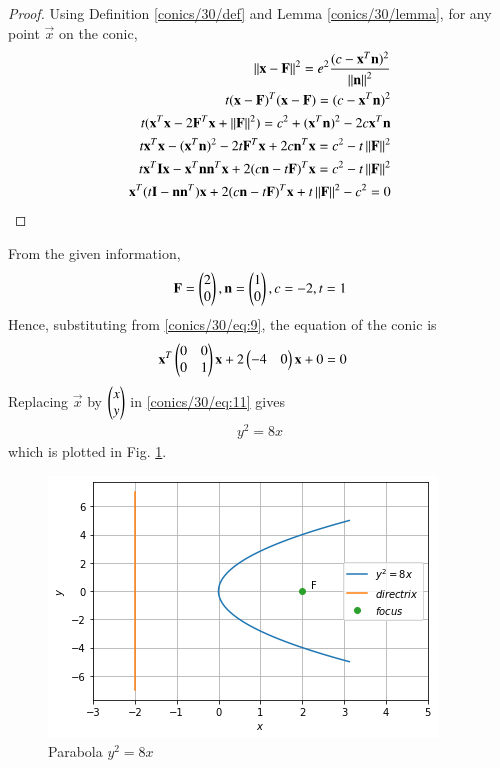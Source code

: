 \begin{proof}

Using Definition \ref{conics/30/def} and Lemma \ref{conics/30/lemma},  for any point $\vec{x}$ on the conic,
\begin{align}
\left\lVert\mathbf{x}-\mathbf{F}\right\rVert^2=e^2 \frac{({c-\mathbf{x}^T\mathbf{n}})^2}{\left\lVert\mathbf{n}\right\rVert^2}\label{conics/30/eq:1} \\
t(\mathbf{x}-\mathbf{F})^T(\mathbf{x}-\mathbf{F})=(c-\mathbf{x}^T\mathbf{n})^2
\\
t(\mathbf{x}^T\mathbf{x}-2\mathbf{F}^T\mathbf{x}+\left\lVert\mathbf{F}\right\rVert^2)=c^2+(\mathbf{x}^T\mathbf{n})^2-2c\mathbf{x}^T\mathbf{n}\\
t\mathbf{x}^T\mathbf{x}-(\mathbf{x}^T\mathbf{n})^2-2t\mathbf{F}^T\mathbf{x}+2c\mathbf{n}^T\mathbf{x}=c^2-t\left\lVert\mathbf{F}\right\rVert^2\\
t\mathbf{x}^T\mathbf{I}\mathbf{x}-\mathbf{x}^T\mathbf{n}\mathbf{n}^T\mathbf{x}+2(c\mathbf{n}-t\mathbf{F})^T\mathbf{x}=c^2-t\left\lVert\mathbf{F}\right\rVert^2\\
\mathbf{x}^T(t\mathbf{I}-\mathbf{n}\mathbf{n}^T)\mathbf{x}+2(c\mathbf{n}-t\mathbf{F})^T\mathbf{x}+t\left\lVert\mathbf{F}\right\rVert^2-c^2=0
\end{align}
\end{proof}
From the given information,
\begin{align}
\mathbf{F}=\begin{pmatrix}2\\0\end{pmatrix},
\mathbf{n}=\begin{pmatrix}1\\0\end{pmatrix},
c=-2\label{conics/30/eq:9},
t=1
\end{align}
Hence, substituting from \eqref{conics/30/eq:9}, the equation of the conic is 
\begin{align}
\mathbf{x}^T\begin{pmatrix}0&0\\0&1\end{pmatrix}\mathbf{x}+2\begin{pmatrix}-4&0\end{pmatrix}\mathbf{x}+0&=0\label{conics/30/eq:11}
\end{align}
%
Replacing $\vec{x}$ by $\begin{pmatrix}x\\y\end{pmatrix}$ in \eqref{conics/30/eq:11} gives
\begin{align}
y^2=8x
\end{align}
which is plotted in Fig.  \ref{conics/30/fig:parabola}.	
\begin{figure}[!ht]
    \centering
    \includegraphics[width=\columnwidth]{solutions/su2021/2/30/figure4.png}
    \caption{Parabola $y^2=8x$ }
    \label{conics/30/fig:parabola}	
    \end{figure}
    
